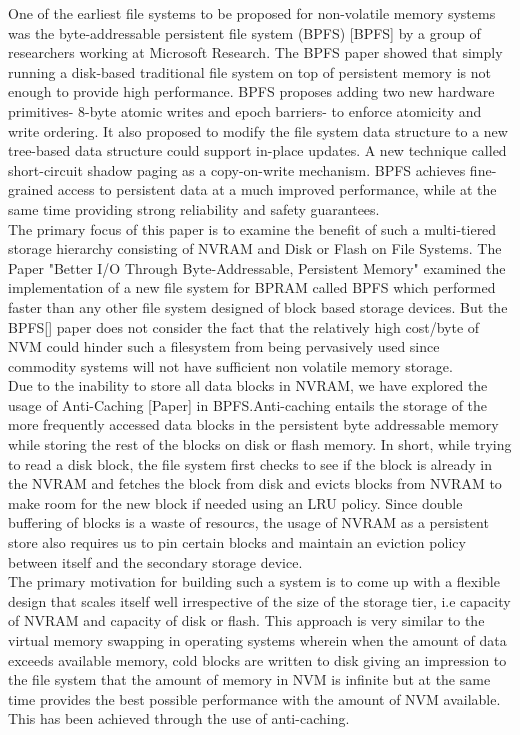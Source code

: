 \documentclass[letterpaper, 10 pt, conference]{ieeeconf}  %
\begin{document}
One of the earliest file systems to be proposed for non-volatile memory systems was the byte-addressable persistent file system (BPFS) [BPFS] by a group of researchers working at Microsoft Research. The BPFS paper showed that simply running a disk-based traditional file system on top of persistent memory is not enough to provide high performance. BPFS proposes adding two new hardware primitives- 8-byte atomic writes and epoch barriers- to enforce atomicity and write ordering. It also proposed to modify the file system data structure to a new tree-based data structure  could support in-place updates. A new technique called short-circuit shadow paging as a copy-on-write mechanism. BPFS achieves fine-grained access to persistent data at a much improved performance, while at the same time providing strong reliability and safety guarantees. \\

The primary focus of this paper is to examine the benefit of such a multi-tiered storage hierarchy consisting of NVRAM and Disk or Flash on File Systems. The Paper "Better I/O Through Byte-Addressable, Persistent Memory" examined the implementation of a new file system for BPRAM called BPFS which performed faster than any other file system designed of block based storage devices. But the BPFS[] paper does not consider the fact that the relatively high cost/byte of NVM could hinder such a filesystem from being pervasively used since commodity systems will not have sufficient non volatile memory storage.\\

Due to the inability to store all data blocks in NVRAM, we have explored the usage of Anti-Caching [Paper] in BPFS.Anti-caching entails the storage of the more frequently accessed data blocks in the persistent byte addressable memory while storing the rest of the blocks on disk or flash memory. In short, while trying to read a disk block, the file system first checks to see if the block is already in the NVRAM and fetches the block from disk and evicts blocks from NVRAM to make room for the new block if needed using an LRU policy. Since double buffering of blocks is a waste of resourcs, the usage of NVRAM as a persistent store also requires us to pin certain blocks and maintain an eviction policy between itself and the secondary storage device. \\

The primary motivation for building such a system is to come up with a flexible design that scales itself well irrespective of the size of the storage tier, i.e capacity of NVRAM and capacity of disk or flash. This approach is very similar to the virtual memory swapping in operating systems wherein when the amount of data exceeds available memory, cold blocks are written to disk giving an impression to the file system that the amount of memory in NVM is infinite but at the same time provides the best possible performance with the amount of NVM available. This has been achieved through the use of anti-caching. 
\end{document}
